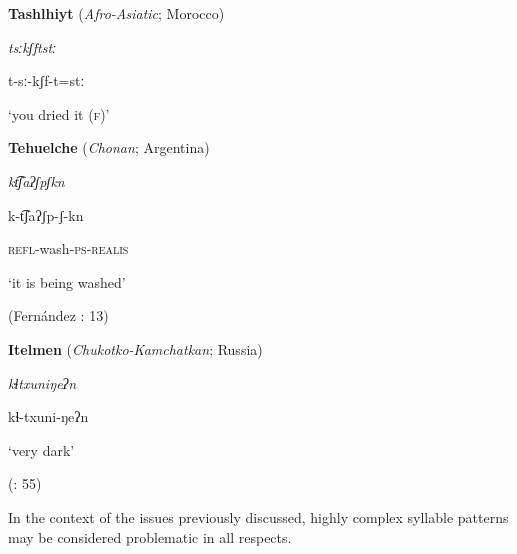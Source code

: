 \citep[204]{Butskhrikidze2002}
\z



\ea\label{ex:(1.10)}
   \textbf{Tashlhiyt} (\textit{Afro-Asiatic}; Morocco)



\textit{tsːkʃftstː}



t{}-sː{}-kʃf{}-t=stː



‘you dried it (\textsc{f})’



\citep[332]{Ridouane2008}

\z


\ea\label{ex:(1.11)}
   \textbf{Tehuelche} (\textit{Chonan}; Argentina)



\textit{kt͡ʃaʔʃpʃkn}



k{}-t͡ʃaʔʃp{}-ʃ{}-kn



\textsc{refl}{}-wash-\textsc{ps-realis}



‘it is being washed’



(Fernández \citealt{GarayHernández2006}: 13)
\z



\ea\label{ex:(1.12)}
   \textbf{Itelmen} (\textit{Chukotko-Kamchatkan}; Russia)



\textit{kɬtxuniŋeʔn}



kɬ{}-txuni{}-ŋeʔn



‘very dark’



(\citealt{GeorgVolodin1999}: 55)

\z


In the context of the issues previously discussed, highly complex syllable patterns may be considered problematic in all respects.



